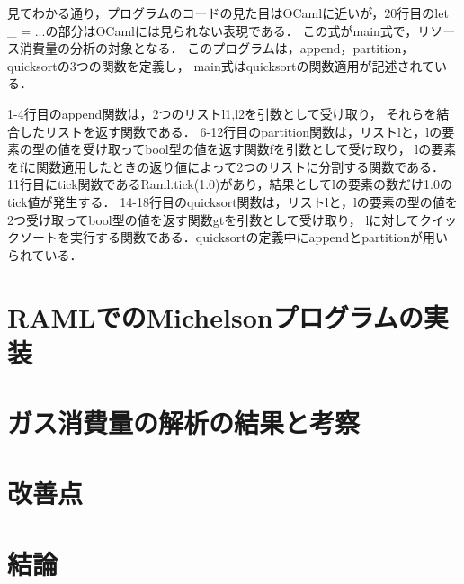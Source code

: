\documentclass{kuisthesis}
\begin{document}
見てわかる通り，プログラムのコードの見た目はOCamlに近いが，20行目のlet \_ = ...の部分はOCamlには見られない表現である．
この式がmain式で，リソース消費量の分析の対象となる．
このプログラムは，append，partition，quicksortの3つの関数を定義し，
main式はquicksortの関数適用が記述されている．

1-4行目のappend関数は，2つのリストl1,l2を引数として受け取り，
それらを結合したリストを返す関数である．
6-12行目のpartition関数は，リストlと，lの要素の型の値を受け取ってbool型の値を返す関数fを引数として受け取り，
lの要素をfに関数適用したときの返り値によって2つのリストに分割する関数である．
11行目にtick関数であるRaml.tick(1.0)があり，結果としてlの要素の数だけ1.0のtick値が発生する．
14-18行目のquicksort関数は，リストlと，lの要素の型の値を2つ受け取ってbool型の値を返す関数gtを引数として受け取り，
lに対してクイックソートを実行する関数である．quicksortの定義中にappendとpartitionが用いられている．




\section{RAMLでのMichelsonプログラムの実装}

\section{ガス消費量の解析の結果と考察}

\section{改善点}

\section{結論}\label{sec-conclusion}

\acknowledgments

\nocite{*}


\end{document}
